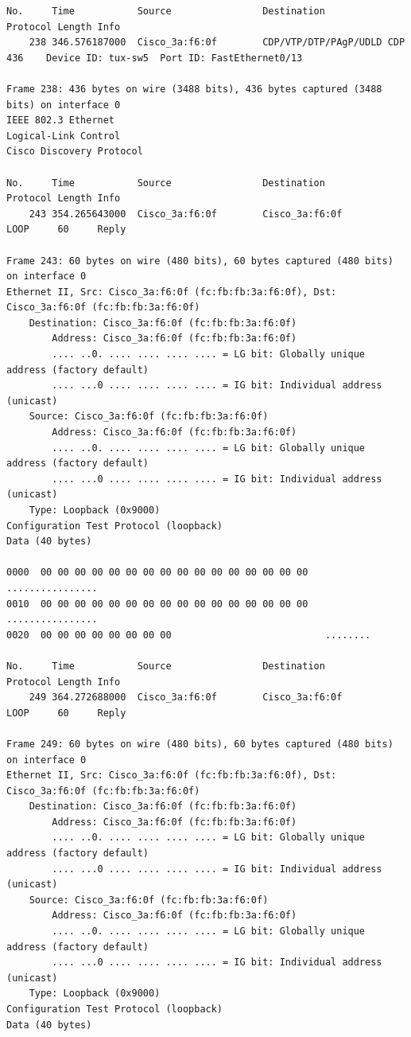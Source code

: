 \documentclass[a4paper,11pt]{article}
\begin{document}
\begin{lstlisting}
No.     Time           Source                Destination           Protocol Length Info
    238 346.576187000  Cisco_3a:f6:0f        CDP/VTP/DTP/PAgP/UDLD CDP      436    Device ID: tux-sw5  Port ID: FastEthernet0/13  

Frame 238: 436 bytes on wire (3488 bits), 436 bytes captured (3488 bits) on interface 0
IEEE 802.3 Ethernet 
Logical-Link Control
Cisco Discovery Protocol

No.     Time           Source                Destination           Protocol Length Info
    243 354.265643000  Cisco_3a:f6:0f        Cisco_3a:f6:0f        LOOP     60     Reply

Frame 243: 60 bytes on wire (480 bits), 60 bytes captured (480 bits) on interface 0
Ethernet II, Src: Cisco_3a:f6:0f (fc:fb:fb:3a:f6:0f), Dst: Cisco_3a:f6:0f (fc:fb:fb:3a:f6:0f)
    Destination: Cisco_3a:f6:0f (fc:fb:fb:3a:f6:0f)
        Address: Cisco_3a:f6:0f (fc:fb:fb:3a:f6:0f)
        .... ..0. .... .... .... .... = LG bit: Globally unique address (factory default)
        .... ...0 .... .... .... .... = IG bit: Individual address (unicast)
    Source: Cisco_3a:f6:0f (fc:fb:fb:3a:f6:0f)
        Address: Cisco_3a:f6:0f (fc:fb:fb:3a:f6:0f)
        .... ..0. .... .... .... .... = LG bit: Globally unique address (factory default)
        .... ...0 .... .... .... .... = IG bit: Individual address (unicast)
    Type: Loopback (0x9000)
Configuration Test Protocol (loopback)
Data (40 bytes)

0000  00 00 00 00 00 00 00 00 00 00 00 00 00 00 00 00   ................
0010  00 00 00 00 00 00 00 00 00 00 00 00 00 00 00 00   ................
0020  00 00 00 00 00 00 00 00                           ........

No.     Time           Source                Destination           Protocol Length Info
    249 364.272688000  Cisco_3a:f6:0f        Cisco_3a:f6:0f        LOOP     60     Reply

Frame 249: 60 bytes on wire (480 bits), 60 bytes captured (480 bits) on interface 0
Ethernet II, Src: Cisco_3a:f6:0f (fc:fb:fb:3a:f6:0f), Dst: Cisco_3a:f6:0f (fc:fb:fb:3a:f6:0f)
    Destination: Cisco_3a:f6:0f (fc:fb:fb:3a:f6:0f)
        Address: Cisco_3a:f6:0f (fc:fb:fb:3a:f6:0f)
        .... ..0. .... .... .... .... = LG bit: Globally unique address (factory default)
        .... ...0 .... .... .... .... = IG bit: Individual address (unicast)
    Source: Cisco_3a:f6:0f (fc:fb:fb:3a:f6:0f)
        Address: Cisco_3a:f6:0f (fc:fb:fb:3a:f6:0f)
        .... ..0. .... .... .... .... = LG bit: Globally unique address (factory default)
        .... ...0 .... .... .... .... = IG bit: Individual address (unicast)
    Type: Loopback (0x9000)
Configuration Test Protocol (loopback)
Data (40 bytes)


\end{lstlisting}
\end{document}

